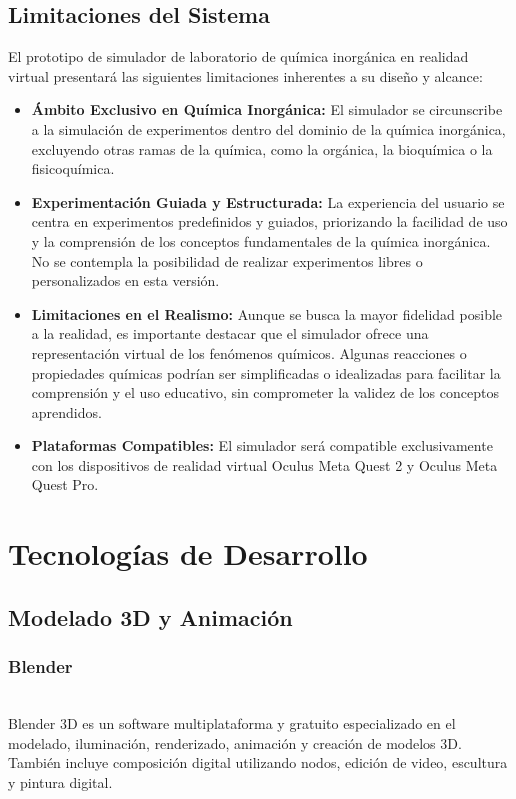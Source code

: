 \subsection{Limitaciones del Sistema}
El prototipo de simulador de laboratorio de química inorgánica en realidad virtual presentará las siguientes limitaciones inherentes a su diseño y alcance: 

\begin{itemize}
    \item \textbf{Ámbito Exclusivo en Química Inorgánica:} El simulador se circunscribe a la simulación de experimentos dentro del dominio de la química inorgánica, excluyendo otras ramas de la química, como la orgánica, la bioquímica o la fisicoquímica. 
    \item \textbf{Experimentación Guiada y Estructurada:} La experiencia del usuario se centra en experimentos predefinidos y guiados, priorizando la facilidad de uso y la comprensión de los conceptos fundamentales de la química inorgánica. No se contempla la posibilidad de realizar experimentos libres o personalizados en esta versión.

    \item \textbf{Limitaciones en el Realismo:} Aunque se busca la mayor fidelidad posible a la realidad, es importante destacar que el simulador ofrece una representación virtual de los fenómenos químicos. Algunas reacciones o propiedades químicas podrían ser simplificadas o idealizadas para facilitar la comprensión y el uso educativo, sin comprometer la validez de los conceptos aprendidos.
    \item \textbf{Plataformas Compatibles:} El simulador será compatible exclusivamente con los dispositivos de realidad virtual Oculus Meta Quest 2 y Oculus Meta Quest Pro. 
\end{itemize}
\newpage
\section{Tecnologías de Desarrollo}
\subsection{Modelado 3D y Animación}
\subsubsection{Blender}\\

Blender 3D es un software multiplataforma y gratuito especializado en el modelado, iluminación, renderizado, animación y creación de modelos 3D. También incluye composición digital utilizando nodos, edición de video, escultura y pintura digital.


